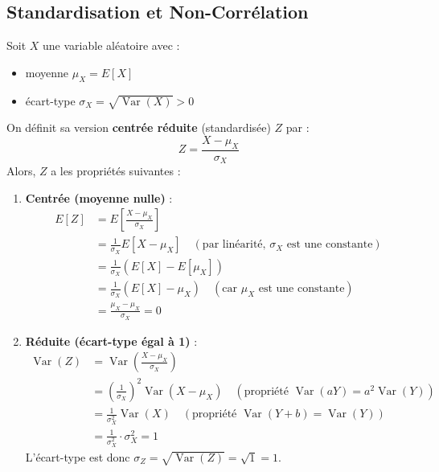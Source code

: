 \subsection{Standardisation et Non-Corrélation}

\begin{definitionbox}
Soit $X$ une variable aléatoire avec :
\begin{itemize}
    \item moyenne $\mu_X = E[X]$
    \item écart-type $\sigma_X = \sqrt{\operatorname{Var}(X)} > 0$
\end{itemize}
On définit sa version \textbf{centrée réduite} (standardisée) $Z$ par :
$$ Z = \frac{X - \mu_X}{\sigma_X} $$
Alors, $Z$ a les propriétés suivantes :
\begin{enumerate}
    \item \textbf{Centrée (moyenne nulle)} :
    \begin{align*}
    E[Z] &= E\left[\frac{X - \mu_X}{\sigma_X}\right] \\
         &= \frac{1}{\sigma_X} E[X - \mu_X] \quad (\text{par linéarité, } \sigma_X \text{ est une constante}) \\
         &= \frac{1}{\sigma_X} (E[X] - E[\mu_X]) \\
         &= \frac{1}{\sigma_X} (E[X] - \mu_X) \quad (\text{car } \mu_X \text{ est une constante}) \\
         &= \frac{\mu_X - \mu_X}{\sigma_X} = 0
    \end{align*}
    \item \textbf{Réduite (écart-type égal à 1)} :
    \begin{align*}
    \operatorname{Var}(Z) &= \operatorname{Var}\left(\frac{X - \mu_X}{\sigma_X}\right) \\
         &= \left(\frac{1}{\sigma_X}\right)^2 \operatorname{Var}(X - \mu_X) \quad (\text{propriété } \operatorname{Var}(aY) = a^2 \operatorname{Var}(Y)) \\
         &= \frac{1}{\sigma_X^2} \operatorname{Var}(X) \quad (\text{propriété } \operatorname{Var}(Y+b) = \operatorname{Var}(Y)) \\
         &= \frac{1}{\sigma_X^2} \cdot \sigma_X^2 = 1
    \end{align*}
    L'écart-type est donc $\sigma_Z = \sqrt{\operatorname{Var}(Z)} = \sqrt{1} = 1$.
\end{enumerate}
\end{definitionbox}

